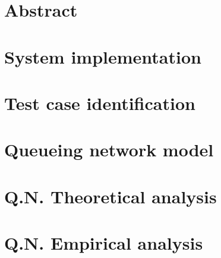 \documentclass[12pt, twoside]{report}
\begin{document}
\tableofcontents
\listoftables
{}
\listoffigures
{}
\lstlistoflistings
{}

\chapter*{Abstract}


\chapter{System implementation}
\setcounter{page}{1}


\chapter{Test case identification}


\chapter{Queueing network model}


\chapter{Q.N. Theoretical analysis}


\chapter{Q.N. Empirical analysis}

\end{document}
